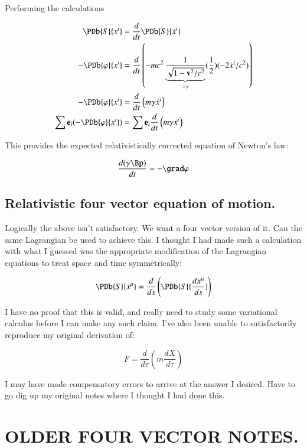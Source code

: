 Performing the calculations

\begin{align*}
\PDb{S}{x^i} &= \frac{d}{dt} \PDb{S}{\dot{x}^i} \\
-\PDb{\varphi}{x^i} &= \frac{d}{dt} \left(-mc^2 \underbrace{\inv{\sqrt{1-\Bv^2/c^2}}}_{=\gamma} (\inv{2})(-2\dot{x}^i/c^2)\right) \\
-\PDb{\varphi}{x^i} &= \frac{d}{dt} \left( m \gamma \dot{x}^i\right) \\
\sum \Be_i (-\PDb{\varphi}{x^i}) &= \sum \Be_i \frac{d}{dt} \left( m \gamma \dot{x}^i\right) \\
\end{align*}

This provides the expected relativistically corrected equation of Newton's law:

\begin{equation}
\frac{d (\gamma \Bp)}{dt} = -\grad \varphi
\end{equation}

\subsection{Relativistic four vector equation of motion. }

Logically the above isn't satisfactory.  We want a four vector version of it.  Can the same Lagrangian
be used to achieve this.  I thought I had made such a calculation with what I guessed was the appropriate
modification of the Lagrangian equations to treat space and time symmetrically:

\begin{equation}
\PDb{S}{x^{\mu}} = \frac{d}{ds} \left( \PDb{S}{\frac{d x^{\mu}}{ds}} \right)
\end{equation}

I have no proof that this is valid, and really need to study some variational calculus before I can make any
such claim.  I've also been unable to satisfactorily reproduce my original derivation of:

\begin{equation}
F = \frac{d}{d\tau}\left( m\frac{dX}{d\tau} \right)
\end{equation}

I may have made compensatory errors to arrive at the answer I desired.  Have to go dig up my original notes
where I thought I had done this.

\section{OLDER FOUR VECTOR NOTES. }

